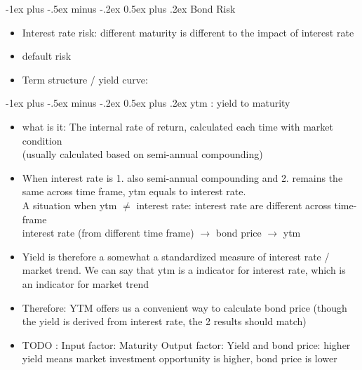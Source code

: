 \documentclass[10pt,landscape]{article}
\makeatletter
\renewcommand{\section}{\@startsection{section}{1}{0mm}%
                                {-1ex plus -.5ex minus -.2ex}%
                                {0.5ex plus .2ex}%
                                {\normalfont\large\bfseries}}
\makeatother
\begin{document}
\begin{multicols}{2}
	\section{Bond Risk}
	\begin{itemize}
		\item Interest rate risk: different maturity is different to the impact of interest rate
		\item default risk
		\item Term structure / yield curve: 
	\end{itemize}


	\section{\color{red}ytm : yield to maturity}
    \begin{itemize}
        \item what is it: The internal rate of return, calculated each time with market condition \\(usually calculated based on semi-annual compounding)
        \item When interest rate is {\color{blue}1. also semi-annual compounding} and {\color{blue}2. remains the same across time frame}, ytm equals to interest rate.\\
        	A situation when ytm $\neq$ interest rate: interest rate are different across time-frame \\
        	{\color{red} interest rate (from different time frame) $\rightarrow$ bond price $\rightarrow$ ytm}
        \item Yield is therefore a somewhat a standardized measure of interest rate / market trend. We can say that ytm is a indicator for interest rate, which is an indicator for market trend
        \item Therefore: YTM offers us a convenient way to calculate bond price (though the yield is derived from interest rate, the 2 results should match)
        \item 	TODO : Input factor:
				Maturity
			Output factor:
			Yield and bond price: higher yield means market investment opportunity is higher, bond price is lower
    \end{itemize}


\end{multicols}
\end{document}

